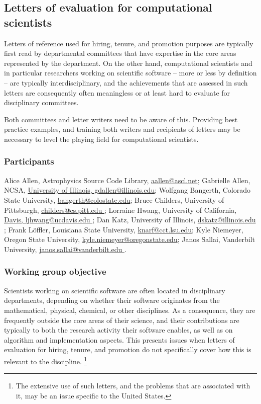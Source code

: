 \subsection{Letters of evaluation for computational scientists}
\label{sec:letters}


Letters of reference used for hiring, tenure, and promotion purposes
are typically first read by departmental committees that have
expertise in the core areas represented by the department. On the
other hand, computational scientists and in particular researchers
working on scientific software -- more or less by definition --
are typically interdisciplinary, and the achievements that are
assessed in such letters are consequently often meaningless or at
least hard to evaluate for disciplinary committees.

Both committees and letter writers need to be aware of this. Providing
best practice examples, and training both writers and recipients of
letters may be necessary to level the playing field for computational
scientists.

\subsubsection{Participants}

Alice Allen, Astrophysics Source Code Library, \url{aallen@ascl.net};
Gabrielle Allen, NCSA, \url{University of Illinois, gdallen@illinois.edu};
Wolfgang Bangerth, Colorado State University, \url{bangerth@colostate.edu};
Bruce Childers, University of Pittsburgh, \url{childers@cs.pitt.edu };
Lorraine Hwang, University of California, \url{Davis, ljhwang@ucdavis.edu };
Dan Katz, University of Illinois, \url{dskatz@illinois.edu };
Frank L{\"o}ffler, Louisiana State University, \url{knarf@cct.lsu.edu};
Kyle Niemeyer, Oregon State University, \url{kyle.niemeyer@oregonstate.edu};
Janos Sallai, Vanderbilt University, \url{janos.sallai@vanderbilt.edu }.

\subsubsection{Working group objective}

Scientists working on scientific software are often located in
disciplinary departments, depending on whether their software
originates from the mathematical, physical, chemical, or other
disciplines. As a consequence, they are frequently outside the core
areas of their science, and their contributions are typically to both
the research activity their software enables, as well as on
algorithm and implementation aspects. This presents issues when
letters of evaluation for hiring, tenure, and promotion do not specifically
cover how this is relevant to the discipline.%
\footnote{The extensive use of such letters, and the problems that are
  associated with it, may be an issue specific to the United States.}

